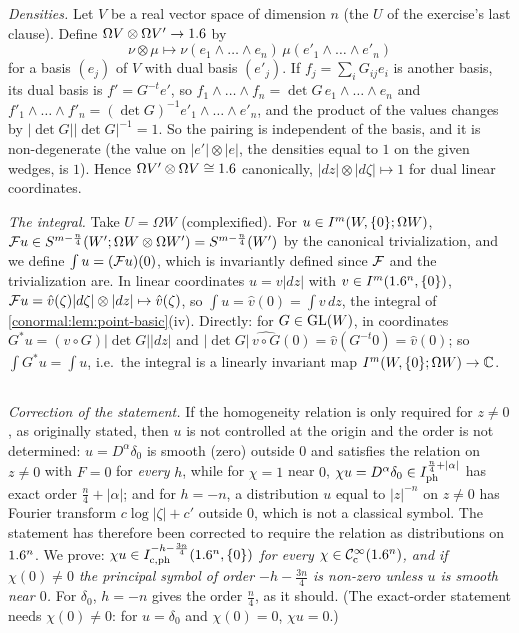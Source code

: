 \emph{Densities.} Let $V$ be a real vector space of dimension $n$ (the $U$ of the exercise's
last clause). Define $\Omega V\otimes\Omega V'\to1.6$ by
\begin{equation*}
\nu\otimes\mu\longmapsto\nu(e_1\wedge\dots\wedge e_n)\,\mu(e'_1\wedge\dots\wedge e'_n)
\end{equation*}
for a basis $(e_j)$ of $V$ with dual basis $(e'_j)$. If $f_j=\sum_iG_{ij}e_i$ is another
basis, its dual basis is $f'=G^{-t}e'$, so $f_1\wedge\dots\wedge f_n=\det G\,e_1\wedge\dots\wedge
e_n$ and $f'_1\wedge\dots\wedge f'_n=(\det G)^{-1}e'_1\wedge\dots\wedge e'_n$, and the product of
the values changes by $|\det G||\det G|^{-1}=1$. So the pairing is independent of the basis,
and it is non-degenerate (the value on $|e'|\otimes|e|$, the densities equal to $1$ on the
given wedges, is $1$). Hence $\Omega V'\otimes\Omega V\cong1.6$ canonically,
$|dz|\otimes|d\zeta|\mapsto1$ for dual linear coordinates.

\emph{The integral.} Take $U=\Omega W$ (complexified). For $u\in I^{m}(W,\{0\};\Omega W)$,
$\mathcal{F} u\in S^{m-\frac n4}(W';\Omega W\otimes\Omega W')=S^{m-\frac n4}(W')$ by the canonical
trivialization, and we define $\int u=(\mathcal{F} u)(0)$, which is invariantly defined since
$\mathcal{F}$ and the trivialization are. In linear coordinates $u=v|dz|$ with
$v\in I^{m}(1.6^n,\{0\})$, $\mathcal{F} u=\hat v(\zeta)|d\zeta|\otimes|dz|\mapsto\hat v(\zeta)$, so
$\int u=\hat v(0)=\int v\,dz$, the integral of \cref{conormal:lem:point-basic}(iv). Directly:
for $G\in\operatorname{GL}(W)$, in coordinates $G^*u=(v\circ G)|\det G||dz|$ and
$|\det G|\,\widehat{v\circ G}(0)=\hat v(G^{-t}0)=\hat v(0)$; so $\int G^*u=\int u$, i.e.\
the integral is a linearly invariant map $I^{m}(W,\{0\};\Omega W)\to\mathbb{C}$.

\subsection*{\Cref{conormal:ex:homog}}
\emph{Correction of the statement.} If the homogeneity relation is only required for
$z\ne0$, as originally stated, then $u$ is not controlled at the origin and the order is not
determined: $u=D^\alpha\delta_0$ is smooth (zero) outside $0$ and satisfies the relation on
$z\ne0$ with $F=0$ for \emph{every} $h$, while for $\chi=1$ near $0$,
$\chi u=D^\alpha\delta_0\in I^{\frac n4+|\alpha|}_{\mathrm{ph}}$ has exact order
$\frac n4+|\alpha|$; and for $h=-n$, a distribution $u$
equal to $|z|^{-n}$ on $z\ne0$ has Fourier transform $c\log|\zeta|+c'$ outside $0$, which is
not a classical symbol. The statement has therefore been corrected to require the relation as
distributions on $1.6^n$. We prove: \emph{$\chi u\in I^{-h-\frac{3n}4}_{\mathrm{c},
\mathrm{ph}}(1.6^n,\{0\})$ for every $\chi\in\mathcal{C}^\infty_{\mathrm{c}}(1.6^n)$, and if $\chi(0)\ne0$ the
principal symbol of order $-h-\frac{3n}4$ is non-zero unless $u$ is smooth near $0$.} For
$\delta_0$, $h=-n$ gives the order $\frac n4$, as it should. (The exact-order statement needs
$\chi(0)\ne0$: for $u=\delta_0$ and $\chi(0)=0$, $\chi u=0$.)

